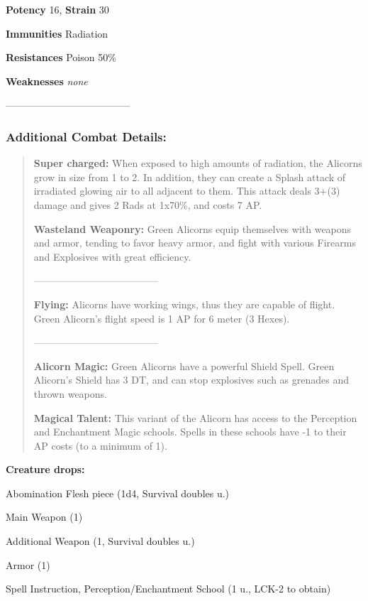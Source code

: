 \documentclass[11pt,a4paper,twocolumn]{book}
\begin{document}
		\noindent
		\textbf{Potency} 16, \textbf{Strain} 30
		
		\noindent
		\textbf{Immunities} Radiation
		
		\noindent
		\textbf{Resistances} Poison 50\%
		
		\noindent
		\textbf{Weaknesses} \emph{none} %
		
		--------------------------------------
		
		\subsubsection*{Additional Combat Details:}
		\begin{verse}
			
			\textbf{Super charged:} When exposed to high amounts of radiation, the Alicorns grow in size from 1 to 2. In addition, they can create a Splash attack of irradiated glowing air to all adjacent to them. This attack deals 3+(3) damage and gives 2 Rads at 1x70\%, and costs 7 AP.	
			
			\textbf{Wasteland Weaponry:} Green Alicorns equip themselves with weapons and armor, tending to favor heavy armor, and fight with various Firearms and Explosives with great efficiency.
			
		--------------------------------------
			
			\textbf{Flying:} Alicorns have working wings, thus they are capable of flight. Green Alicorn's flight speed is 1 AP for 6 meter (3 Hexes).
			
		--------------------------------------
			
			\textbf{Alicorn Magic:} Green Alicorns have a powerful Shield Spell. Green Alicorn's Shield has 3 DT, and can stop explosives such as grenades and thrown weapons.
			
			\textbf{Magical Talent:} This variant of the Alicorn has access to the Perception and Enchantment Magic schools. Spells in these schools have -1 to their AP costs (to a minimum of 1).
			
			
			
		\end{verse}

		
		\textbf{Creature drops:}
		\begin{compactitem}
			\item Abomination Flesh piece (1d4, Survival doubles u.)
			\item Main Weapon (1)
			\item Additional Weapon (1, Survival doubles u.)
			\item Armor (1)
			\item Spell Instruction, Perception/Enchantment School (1 u., LCK-2 to obtain)
		\end{compactitem}
		
\end{document}
